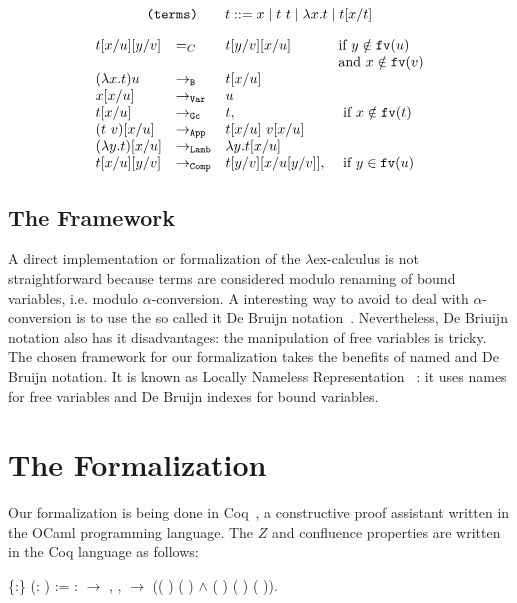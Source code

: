\documentclass{llncs}
\newcommand{\fv}[1]{{\tt fv}(#1)}
\begin{document}
$$\mbox{\tt (terms)}\;\;\;\;\;\;\; t ::= x \mid t\ t \mid \lambda x.t \mid t[x/t]$$

$$\begin{array}{llll}
    t[x/u][y/v] & =_C & t[y/v][x/u] & \mbox{if } y\notin \fv{u} \\
                &&& \mbox{and } x\notin \fv{v} \\
    (\lambda x.t) u & \to_{\tt B} & t[x/u] & \\
    x[x/u] & \to_{\tt Var} & u & \\      
    t[x/u] & \to_{\tt Gc} & t, & \mbox{ if } x \notin\fv{t} \\      
    (t\ v)[x/u] & \to_{\tt App} & t[x/u]\ v[x/u] & \\
    (\lambda y. t)[x/u] & \to_{\tt Lamb} & \lambda y.t[x/u] & \\
    t[x/u][y/v] & \to_{\tt Comp} & t[y/v][x/u[y/v]], & \mbox{ if } y \in\fv{u}            
  \end{array}$$
  
  \subsection{The Framework}


  A direct implementation or formalization of the $\lambda$ex-calculus
  is not straightforward because terms are considered modulo renaming
  of bound variables, i.e. modulo $\alpha$-conversion. A interesting
  way to avoid to deal with $\alpha$-conversion is to use the so
  called {it De Bruijn}
  notation~\cite{bruijn72:_lambd_churc_rosser}. Nevertheless, De
  Briuijn notation also has it disadvantages: the manipulation of free
  variables is tricky. The chosen framework for our formalization
  takes the benefits of named and De Bruijn notation. It is known as
  Locally Nameless Representation ~\cite{Ch11}: it uses names for free
  variables and De Bruijn indexes for bound variables.

\section{The Formalization}
  
Our formalization is being done in Coq~\cite{CoqTeam}, a constructive
proof assistant written in the OCaml programming language. The
$Z$ and confluence properties are written in the Coq language as follows:

\begin{coqdoccode}
  \coqdocnoindent {}
   \{:\}
  (:  ) :=
  \coqdoctac{\ensuremath{\exists}} :
  \ensuremath{\rightarrow} ,
  \coqdockw{\ensuremath{\forall}}  ,
     \ensuremath{\rightarrow}
  (( ) 
  ( ) \ensuremath{\land}
  ( ) (
  ) ( )).\coqdoceol
\end{coqdoccode}
\end{document}
